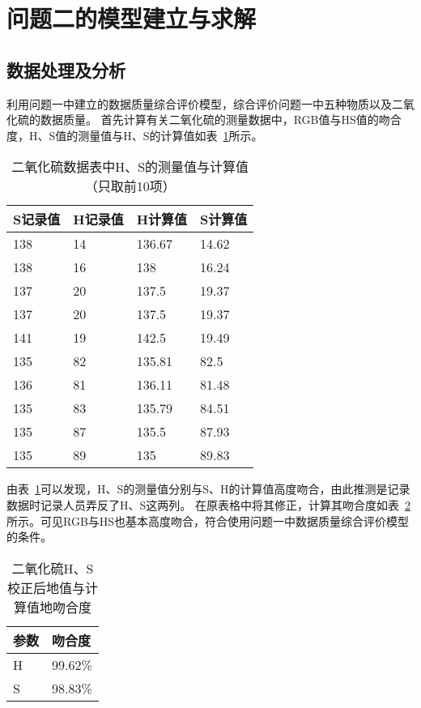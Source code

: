 \section{问题二的模型建立与求解}

\subsection{数据处理及分析}

利用问题一中建立的数据质量综合评价模型，综合评价问题一中五种物质以及二氧化硫的数据质量。
首先计算有关二氧化硫的测量数据中，RGB值与HS值的吻合度，H、S值的测量值与H、S的计算值如表~\ref{SO2_HSCheck}所示。

\begin{table}[]
    \centering
    \caption{二氧化硫数据表中H、S的测量值与计算值（只取前10项）}
    \label{SO2_HSCheck}
    \begin{tabular}{@{}llll@{}}
    \toprule
    S记录值 & H记录值 & H计算值        & S计算值        \\ \midrule
    138  & 14   & 136.67 & 14.62 \\
    138  & 16   & 138         & 16.24 \\
    137  & 20   & 137.5       & 19.37 \\
    137  & 20   & 137.5       & 19.37 \\
    141  & 19   & 142.5       & 19.49 \\
    135  & 82   & 135.81 & 82.5        \\
    136  & 81   & 136.11 & 81.48 \\
    135  & 83   & 135.79 & 84.51 \\
    135  & 87   & 135.5       & 87.93 \\
    135  & 89   & 135         & 89.83 \\ \bottomrule
    \end{tabular}
    \end{table}

由表~\ref{SO2_HSCheck}可以发现，H、S的测量值分别与S、H的计算值高度吻合，由此推测是记录数据时记录人员弄反了H、S这两列。
在原表格中将其修正，计算其吻合度如表~\ref{SO2_HSMatch}所示。可见RGB与HS也基本高度吻合，符合使用问题一中数据质量综合评价模型的条件。

\begin{table}[]
    \centering
    \caption{二氧化硫H、S校正后地值与计算值地吻合度}
    \label{SO2_HSMatch}
    \begin{tabular}{@{}ll@{}}
    \toprule
    参数 & 吻合度     \\ \midrule
    H  & 99.62\% \\
    S  & 98.83\% \\ \bottomrule
    \end{tabular}
    \end{table}

